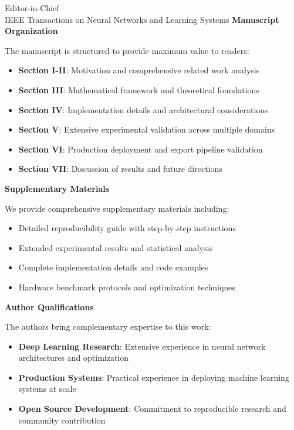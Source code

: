 \documentclass[11pt]{letter}
\begin{document}
\begin{letter}{Editor-in-Chief\\
IEEE Transactions on Neural Networks and Learning Systems}
\textbf{\large Manuscript Organization}

\vspace{0.5em}

The manuscript is structured to provide maximum value to readers:

\begin{itemize}
    \item \textbf{Section I-II}: Motivation and comprehensive related work analysis
    \item \textbf{Section III}: Mathematical framework and theoretical foundations
    \item \textbf{Section IV}: Implementation details and architectural considerations
    \item \textbf{Section V}: Extensive experimental validation across multiple domains
    \item \textbf{Section VI}: Production deployment and export pipeline validation
    \item \textbf{Section VII}: Discussion of results and future directions
\end{itemize}

\textbf{\large Supplementary Materials}

\vspace{0.5em}

We provide comprehensive supplementary materials including:

\begin{itemize}
    \item Detailed reproducibility guide with step-by-step instructions
    \item Extended experimental results and statistical analysis
    \item Complete implementation details and code examples
    \item Hardware benchmark protocols and optimization techniques
\end{itemize}

\textbf{\large Author Qualifications}

\vspace{0.5em}

The authors bring complementary expertise to this work:

\begin{itemize}
    \item \textbf{Deep Learning Research}: Extensive experience in neural network architectures and optimization
    \item \textbf{Production Systems}: Practical experience in deploying machine learning systems at scale
    \item \textbf{Open Source Development}: Commitment to reproducible research and community contribution
\end{itemize}


\end{letter}
\end{document}
